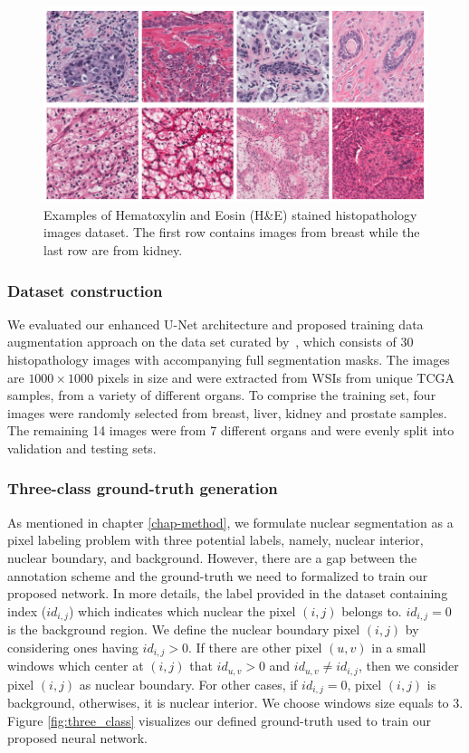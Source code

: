 \begin{figure}[thb]
    \centering
    \includegraphics[width=\textwidth]{resources/5_H_E_examples.png}
    \caption{Examples of Hematoxylin and Eosin (H\&E) stained histopathology images dataset. The first row contains images from breast while the last row are from kidney.}
    \label{fig:h_and_e_images}
\end{figure}

\subsubsection{Dataset construction}
We evaluated our enhanced U-Net architecture and proposed training data augmentation approach on the data set curated by~\cite{he_dataset_kumar}, which consists of 30 histopathology images with accompanying full segmentation masks.
The images are $1000 \times 1000$ pixels in size and were extracted from WSIs from unique TCGA samples, from a variety of different organs.
To comprise the training set, four images were randomly selected from breast, liver, kidney and prostate samples. The remaining 14 images were from 7 different organs and were evenly split into validation and testing sets.

\subsubsection{Three-class ground-truth generation}

As mentioned in chapter \ref{chap-method}, we formulate nuclear segmentation as a pixel labeling problem with three potential labels, namely, nuclear interior, nuclear boundary, and background. However, there are a gap between the annotation scheme and the ground-truth we need to formalized to train our proposed network. In more details, the label provided in the dataset containing index ($id_{i,j}$) which indicates which nuclear the pixel $(i, j)$ belongs to. $id_{i,j}=0$ is the background region. We define the nuclear boundary pixel $(i,j)$ by considering ones having $id_{i,j} > 0$. If there are other pixel $(u, v)$ in a small windows which center at $(i, j)$ that $id_{u, v} > 0$ and $id_{u, v} \neq id_{i, j}$, then we consider pixel $(i, j)$ as nuclear boundary. For other cases, if $id_{i, j} = 0$, pixel $(i, j)$ is background, otherwises, it is nuclear interior. We choose windows size equals to 3. Figure \ref{fig:three_class} visualizes our defined ground-truth used to train our proposed neural network. 

